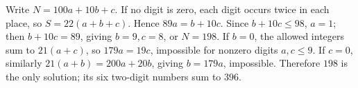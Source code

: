 Write $N=100a+10b+c$. If no digit is zero, each digit occurs twice in each place, so $S=22(a+b+c)$. Hence $89a=b+10c$. Since $b+10c\le98$, $a=1$; then $b+10c=89$, giving $b=9,c=8$, or $N=198$. If $b=0$, the allowed integers sum to $21(a+c)$, so $179a=19c$, impossible for nonzero digits $a,c\le9$. If $c=0$, similarly $21(a+b)=200a+20b$, giving $b=179a$, impossible. Therefore $\boxed{198}$ is the only solution; its six two-digit numbers sum to $396$.
